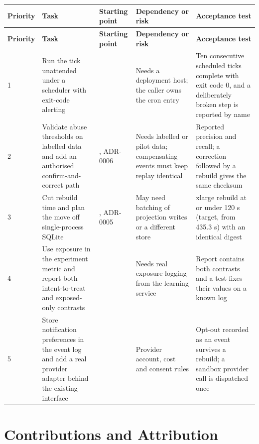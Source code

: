 \documentclass[11pt,a4paper]{article}
\newcommand{\hdr}[1]{\textbf{\color{white}\sffamily\small #1}}
\renewcommand{\_}{\textunderscore\allowbreak{}}
\begin{document}
{\small
\begin{xltabular}{\textwidth}{@{}L{1.2cm} L{3.4cm} L{3.0cm} L{2.8cm} Y@{}}
 \hdr{Priority} & \hdr{Task} & \hdr{Starting point} & \hdr{Dependency or risk} & \hdr{Acceptance test} \\
\endfirsthead
{} \hdr{Priority} & \hdr{Task} & \hdr{Starting point} & \hdr{Dependency or risk} & \hdr{Acceptance test} \\
\endhead
{} 1 & Run the tick unattended under a scheduler with exit-code alerting &  & Needs a deployment host; the caller owns the cron entry & Ten consecutive scheduled ticks complete with exit code 0, and a deliberately broken step is reported by name \\
2 & Validate abuse thresholds on labelled data and add an authorised confirm-and-correct path & , ADR-0006 & Needs labelled or pilot data; compensating events must keep replay identical & Reported precision and recall; a correction followed by a rebuild gives the same checksum \\
 3 & Cut rebuild time and plan the move off single-process SQLite & , ADR-0005 & May need batching of projection writes or a different store & xlarge rebuild at or under 120 s (target, from 435.3 s) with an identical digest \\
4 & Use exposure in the experiment metric and report both intent-to-treat and exposed-only contrasts &  & Needs real exposure logging from the learning service & Report contains both contrasts and a test fixes their values on a known log \\
 5 & Store notification preferences in the event log and add a real provider adapter behind the existing interface &  & Provider account, cost and consent rules & Opt-out recorded as an event survives a rebuild; a sandbox provider call is dispatched once \\
\end{xltabular}
}


\section{Contributions and Attribution}
\end{document}
